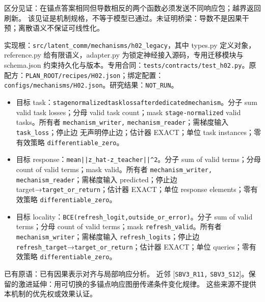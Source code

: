 \documentclass[
  10pt,
]{article}
\begin{document}
区分见证：在锚点答案相同但导数相反的两个函数必须发送不同响应包；越界返回刷新。
该见证是机制规格，不等于模型已通过。未证明桥梁：导数不是因果干预；离散语义不保证可线性化。

实现根：{\small\nolinkurl{src/latent_comm/mechanisms/h02_legacy}}，其中
types.py 定义对象，reference.py 给有限语义，adapter.py
为锁定神经接入源码，专用迁移模块与 schema.json
约束持久化与版本。专用合同：{\small\nolinkurl{tests/contracts/test_h02.py}}。原配方：{\small\nolinkurl{PLAN_ROOT/recipes/H02.json}}；绑定配置：{\small\nolinkurl{configs/mechanisms/H02.json}}。研究结果：\nolinkurl{NOT_RUN}。

\begin{itemize}
\item
  目标
  task：{\small\nolinkurl{stage}\hspace{0.333em}\nolinkurl{normalized}\hspace{0.333em}\nolinkurl{task}\hspace{0.333em}\nolinkurl{loss}\hspace{0.333em}\nolinkurl{after}\hspace{0.333em}\nolinkurl{dedicated}\hspace{0.333em}\nolinkurl{mechanism}}。分子
  sum valid task losses；分母 valid task count；mask
  \nolinkurl{stage-normalized} valid tasks。所有者
  \nolinkurl{mechanism_writer,} \nolinkurl{mechanism_reader}；需梯度输入
  \nolinkurl{task_loss}；停止边 无声明停止边；估计器 EXACT；单位 task
  instances；零有效策略 \nolinkurl{differentiable_zero}。
\item
  目标
  response：{\small\nolinkurl{mean}\hspace{0.333em}\nolinkurl{||z_hat-z_teacher||^2}}。分子
  sum of valid terms；分母 count of valid terms；mask valid。所有者
  \nolinkurl{mechanism_writer,} \nolinkurl{mechanism_reader}；需梯度输入
  predicted；停止边 target→\nolinkurl{target_or_return}；估计器
  EXACT；单位 response elements；零有效策略
  \nolinkurl{differentiable_zero}。
\item
  目标
  locality：{\small\nolinkurl{BCE(refresh_logit,outside_or_error)}}。分子
  sum of valid terms；分母 count of valid terms；mask
  \nolinkurl{refresh_valid}。所有者
  \nolinkurl{mechanism_writer}；需梯度输入
  \nolinkurl{refresh_logits}；停止边
  \nolinkurl{refresh_target}→\nolinkurl{target_or_return}；估计器
  EXACT；单位 queries；零有效策略 \nolinkurl{differentiable_zero}。
\end{itemize}

已有原语：已有因果表示对齐与局部响应分析。 近邻 {[}\nolinkurl{SBV3_R11,}
\nolinkurl{SBV3_S12}{]}。保留的激进延伸：用可切换的多锚点响应图册传递条件变化规律。
这些来源不提供本机制的优先权或效果认证。
\end{document}
